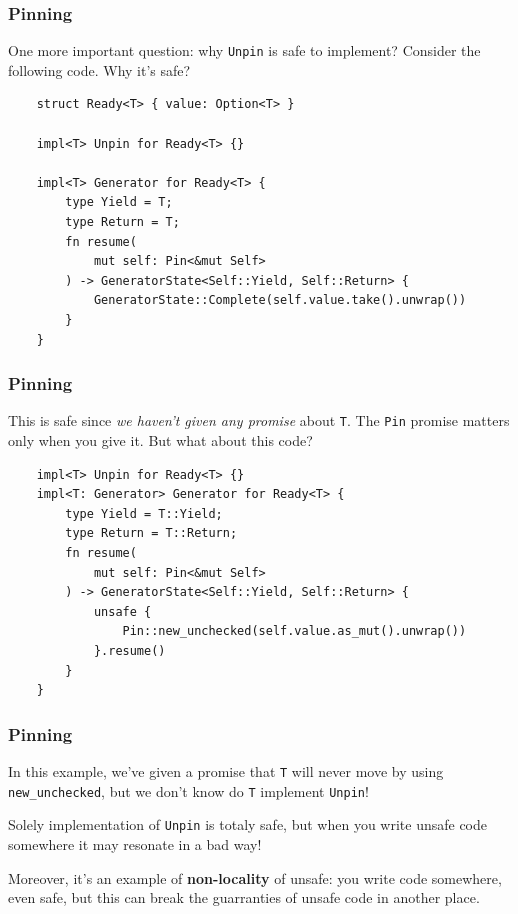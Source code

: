 \documentclass[aspectratio=1610,t]{beamer}
\begin{document}

\begin{frame}[fragile]
\frametitle{Pinning}
One more important question: why \texttt{Unpin} is safe to implement? Consider the following code. Why it's safe?

\begin{verbatim}
    struct Ready<T> { value: Option<T> }

    impl<T> Unpin for Ready<T> {}

    impl<T> Generator for Ready<T> {
        type Yield = T;
        type Return = T;
        fn resume(
            mut self: Pin<&mut Self>
        ) -> GeneratorState<Self::Yield, Self::Return> {
            GeneratorState::Complete(self.value.take().unwrap())
        }
    }
\end{verbatim}
\end{frame}


\begin{frame}[fragile]
\frametitle{Pinning}
This is safe since \textit{we haven't given any promise} about \texttt{T}. The \texttt{Pin} promise matters only when you give it. But what about this code?

\begin{verbatim}
    impl<T> Unpin for Ready<T> {}
    impl<T: Generator> Generator for Ready<T> {
        type Yield = T::Yield;
        type Return = T::Return;
        fn resume(
            mut self: Pin<&mut Self>
        ) -> GeneratorState<Self::Yield, Self::Return> {
            unsafe {
                Pin::new_unchecked(self.value.as_mut().unwrap())
            }.resume()
        }
    }
\end{verbatim}
\end{frame}


\begin{frame}[fragile]
\frametitle{Pinning}
In this example, we've given a promise that \texttt{T} will never move by using \texttt{new\_unchecked}, but we don't know do \texttt{T} implement \texttt{Unpin}!

Solely implementation of \texttt{Unpin} is totaly safe, but when you write unsafe code somewhere it may resonate in a bad way!

Moreover, it's an example of \textbf{non-locality} of unsafe: you write code somewhere, even safe, but this can break the guarranties of unsafe code in another place.
\end{frame}
\end{document}
